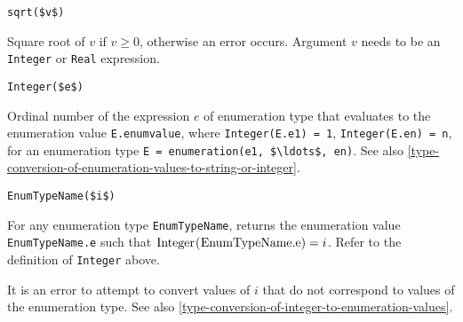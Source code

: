 \begin{functiondefinition}[sqrt]
\begin{synopsis}\begin{lstlisting}
sqrt($v$)
\end{lstlisting}\end{synopsis}
\begin{semantics}
Square root of $v$ if $v \geq 0$, otherwise an error occurs.
Argument $v$ needs to be an \lstinline!Integer! or \lstinline!Real! expression.
\end{semantics}
\end{functiondefinition}

\begin{operatordefinition*}[Integer]\label{modelica:integer-of-enumeration}
\begin{synopsis}\begin{lstlisting}
Integer($e$)
\end{lstlisting}\end{synopsis}
\begin{semantics}
Ordinal number of the expression $e$ of enumeration type that evaluates to the enumeration value \lstinline!E.enumvalue!, where \lstinline!Integer(E.e1) = 1!, \lstinline!Integer(E.en) = n!, for an enumeration type \lstinline!E = enumeration(e1, $\ldots$, en)!.
See also \cref{type-conversion-of-enumeration-values-to-string-or-integer}.
\end{semantics}
\end{operatordefinition*}

\begin{operatordefinition*}[<EnumTypeName>]\label{modelica:enumeration-of-integer}
\begin{synopsis}\begin{lstlisting}
EnumTypeName($i$)
\end{lstlisting}\end{synopsis}
\begin{semantics}
For any enumeration type \lstinline!EnumTypeName!, returns the enumeration value \lstinline!EnumTypeName.e! such that $\text{\lstinline!Integer(EnumTypeName.e)!} = i$.
Refer to the definition of \lstinline!Integer! above.

It is an error to attempt to convert values of $i$ that do not correspond to values of the enumeration type.
See also \cref{type-conversion-of-integer-to-enumeration-values}.
\end{semantics}
\end{operatordefinition*}

